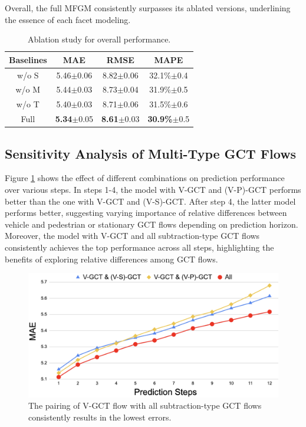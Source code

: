 \documentclass[letterpaper]{article} %
\begin{document}
\noindent Overall, the full MFGM consistently surpasses its ablated versions, underlining the essence of each facet modeling.
\begin{table}[h]
  \small
  \centering
  
  \begin{tabular}{c|ccc}
    \hline
    Baselines & MAE & RMSE & MAPE  \\
    \hline
    w/o S &  {5.46}$\pm$0.06	& {8.82}$\pm$0.06 & {32.1\%}$\pm$0.4 \\
    w/o M &  {5.44}$\pm$0.03	& {8.73}$\pm$0.04 & {31.9\%}$\pm$0.5 \\
    w/o T &  {5.40}$\pm$0.03	& {8.71}$\pm$0.06 & {31.5\%}$\pm$0.6 \\
    Full &  \textbf{5.34}$\pm$0.05	& \textbf{8.61}$\pm$0.03 & \textbf{30.9\%}$\pm$0.5 \\
    \hline
  \end{tabular}
  \caption{Ablation study for overall performance.}
  \label{table:ablation}
\end{table}
\subsection{Sensitivity Analysis of Multi-Type GCT Flows}
Figure \ref{fig:sensitivity} shows the effect of different combinations on prediction performance over various steps. In steps 1-4, the model with V-GCT and (V-P)-GCT performs better than the one with V-GCT and (V-S)-GCT. After step 4, the latter model performs better, suggesting varying importance of relative differences between vehicle and pedestrian or stationary GCT flows depending on prediction horizon. Moreover, the model with V-GCT and all subtraction-type GCT flows consistently achieves the top performance across all steps, highlighting the benefits of exploring relative differences among GCT flows.

\begin{figure}[h]
\centering
\includegraphics[width=1\linewidth]{Figure/parameter_sensitivity.png}
\caption{The pairing of V-GCT flow with all subtraction-type GCT flows consistently results in the lowest errors.}
\label{fig:sensitivity}
\end{figure}
\end{document}
